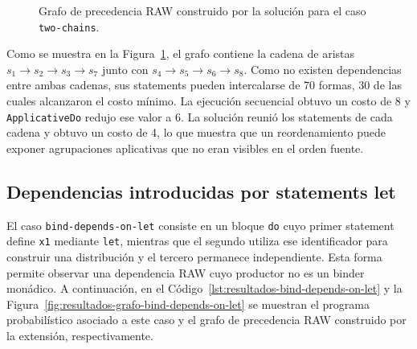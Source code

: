 \begin{figure}[ht]
\centering
\begingroup
\setgraphnodesize{1.55cm}{0.85cm}{8pt}
\begin{PrecedenceGraph}[node distance=0.35cm and 0.2cm]
\end{PrecedenceGraph}
\endgroup
\caption[Grafo RAW del caso \texttt{two-chains}.]{Grafo de precedencia RAW construido por la solución para el caso \texttt{two-chains}.}
\label{fig:resultados-grafo-dos-cadenas}
\end{figure}

Como se muestra en la Figura~\ref{fig:resultados-grafo-dos-cadenas}, el grafo contiene la cadena de aristas $s_1\to s_2\to s_3\to s_7$ junto con $s_4\to s_5\to s_6\to s_8$. Como no existen dependencias entre ambas cadenas, sus statements pueden intercalarse de 70 formas, 30 de las cuales alcanzaron el costo mínimo. La ejecución secuencial obtuvo un costo de 8 y \texttt{ApplicativeDo} redujo ese valor a 6. La solución reunió los statements de cada cadena y obtuvo un costo de 4, lo que muestra que un reordenamiento puede exponer agrupaciones aplicativas que no eran visibles en el orden fuente.

\subsection{Dependencias introducidas por statements let}

El caso \texttt{bind-depends-on-let} consiste en un bloque \texttt{do} cuyo primer statement define \texttt{x1} mediante \texttt{let}, mientras que el segundo utiliza ese identificador para construir una distribución y el tercero permanece independiente. Esta forma permite observar una dependencia RAW cuyo productor no es un binder monádico. A continuación, en el Código~\ref{lst:resultados-bind-depends-on-let} y la Figura~\ref{fig:resultados-grafo-bind-depends-on-let} se muestran el programa probabilístico asociado a este caso y el grafo de precedencia RAW construido por la extensión, respectivamente.

